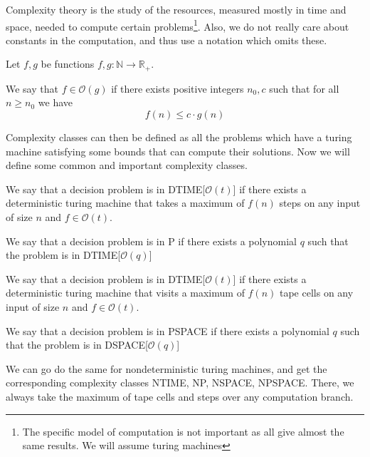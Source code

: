 Complexity theory is the study of the resources, measured mostly in time and space, needed to compute certain problems\footnote{The specific model of computation is not important as all give almost the same results. We will assume turing machines}.
Also, we do not really care about constants in the computation, and thus use a notation which omits these.

\begin{define}
    Let $f, g$ be functions $f, g: \mathbb{N} \to \mathbb{R}_+$.

    We say that $f \in \mathcal{O}(g)$ if there exists positive integers $n_0, c$ such that for all $n \geq n_0$ we have \[f(n) \leq c\cdot g(n)\]
\end{define}

Complexity classes can then be defined as all the problems which have a turing machine satisfying some bounds that can compute their solutions.
Now we will define some common and important complexity classes.

\begin{define}
    [{DTIME[$\mathcal{O}(t)$]}]
    We say that a decision problem is in DTIME[$\mathcal{O}(t)$] if there exists a deterministic turing machine that takes a maximum of $f(n)$ steps on any input of size $n$ and $f \in \mathcal{O}(t)$.
\end{define}

\begin{define}[P]
    We say that a decision problem is in P if there exists a polynomial $q$ such that the problem is in DTIME[$\mathcal{O}(q)$]
\end{define}

\begin{define}
    [{DSPACE[$\mathcal{O}(t)$]}]
    We say that a decision problem is in DTIME[$\mathcal{O}(t)$] if there exists a deterministic turing machine that visits a maximum of $f(n)$ tape cells on any input of size $n$ and $f \in \mathcal{O}(t)$.
\end{define}

\begin{define}[PSPACE]
    We say that a decision problem is in PSPACE if there exists a polynomial $q$ such that the problem is in DSPACE[$\mathcal{O}(q)$]
\end{define}

We can go do the same for nondeterministic turing machines, and get the corresponding complexity classes NTIME, NP, NSPACE, NPSPACE.
There, we always take the maximum of tape cells and steps over any computation branch.

